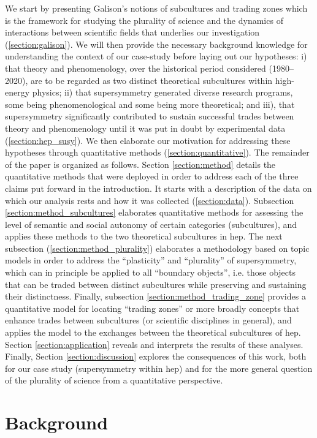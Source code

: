 \documentclass[smallextended]{svjour3}
\begin{document}
We start by presenting Galison's notions of subcultures and trading zones which is the framework for studying the plurality of science and the dynamics of interactions between scientific fields that underlies our investigation 
(\ref{section:galison}). We will then provide the necessary background knowledge for understanding the context of our case-study before laying out our hypotheses: i) that theory and phenomenology, over the historical period considered (1980--2020), are to be regarded as two distinct theoretical subcultures within high-energy physics; ii) that supersymmetry generated diverse research programs, some being phenomenological and some being more theoretical; and iii), that supersymmetry significantly contributed to sustain successful trades between theory and phenomenology until it was put in doubt by experimental data (\ref{section:hep_susy}). We then elaborate our motivation for addressing these hypotheses through quantitative methods (\ref{section:quantitative}). The remainder of the paper is organized as follows. Section \ref{section:method} details the quantitative methods that were deployed in order to address each of the three claims put forward in the introduction. It starts with a description of the data on which our analysis rests and how it was collected (\ref{section:data}). Subsection \ref{section:method_subcultures} elaborates quantitative methods for assessing the level of semantic and social autonomy of certain categories (subcultures), and applies these methods to the two theoretical subcultures in \gls{hep}. The next subsection (\ref{section:method_plurality}) elaborates a methodology based on topic models in order to address the ``plasticity'' and ``plurality'' of supersymmetry, which can in principle be applied to all ``boundary objects'', i.e. those objects that can be traded between distinct subcultures while preserving and sustaining their distinctness. Finally, subsection \ref{section:method_trading_zone} provides a quantitative model for locating ``trading zones'' or more broadly concepts that enhance trades between subcultures (or scientific disciplines in general), and applies the model to the exchanges between the theoretical subcultures of \gls{hep}. Section \ref{section:application} reveals and interprets the results of these analyses. Finally, Section \ref{section:discussion} explores the consequences of this work, both for our case study (supersymmetry within \gls{hep}) and for the more general question of the plurality of science from a quantitative perspective.

\section{\label{section:background}Background}
\end{document}
